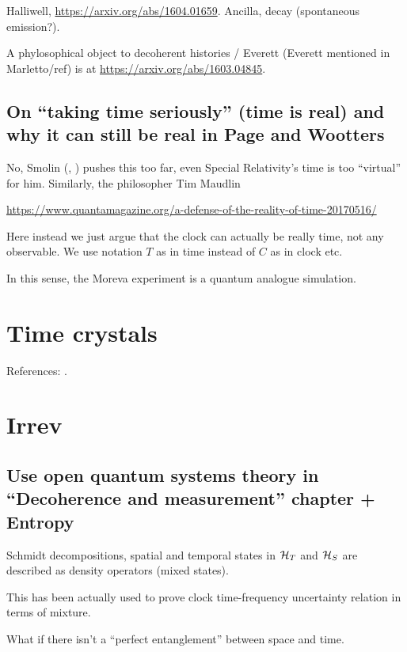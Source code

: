 Halliwell, \url{https://arxiv.org/abs/1604.01659}. Ancilla, decay (spontaneous emission?).

A phylosophical object to decoherent histories / Everett (Everett mentioned in Marletto/ref)
is at
\url{https://arxiv.org/abs/1603.04845}.



\subsection[On ``taking time seriously'']{On ``taking time seriously'' (time is real) and why it can still be real in Page and Wootters}

No, Smolin
(, )
pushes this too far, even Special Relativity's time is too ``virtual'' for him.
Similarly, the philosopher Tim Maudlin

\url{https://www.quantamagazine.org/a-defense-of-the-reality-of-time-20170516/}

Here instead we just argue that the clock can actually be really time, not any observable.
We use notation $T$ as in time instead of $C$ as in clock etc.

In this sense, the Moreva experiment is a quantum analogue simulation.


\section{Time crystals}

References: \cite{crystal2,crystal3,crystal2012}.


\section{Irrev}

\cite[\s IV. UNBOUNDED-ENERGY CLOCKS?]{Maccone:Pauli}

\subsection{Use open quantum systems theory in ``Decoherence and measurement'' chapter + Entropy}
Schmidt decompositions, spatial and temporal states in
$\mathcal{H}_T$ and $\mathcal{H}_S$
are described as density operators
(mixed states).

This has been actually used to prove clock time-frequency uncertainty relation
in terms of mixture.

What if there isn't a ``perfect entanglement'' between space and time.


